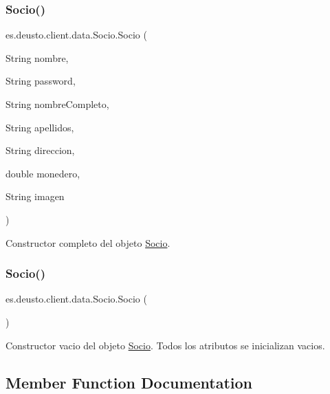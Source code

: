 \subsubsection{\texorpdfstring{Socio()}{Socio()}\hspace{0.1cm}{\footnotesize\ttfamily [1/2]}}
{\footnotesize\ttfamily es.\+deusto.\+client.\+data.\+Socio.\+Socio (\begin{DoxyParamCaption}\item[{String}]{nombre,  }\item[{String}]{password,  }\item[{String}]{nombre\+Completo,  }\item[{String}]{apellidos,  }\item[{String}]{direccion,  }\item[{double}]{monedero,  }\item[{String}]{imagen }\end{DoxyParamCaption})}

Constructor completo del objeto \mbox{\hyperlink{classes_1_1deusto_1_1client_1_1data_1_1_socio}{Socio}}. \mbox{\label{classes_1_1deusto_1_1client_1_1data_1_1_socio_afc3a227c9275ef5622c8b80106ed76a2}} 
\subsubsection{\texorpdfstring{Socio()}{Socio()}\hspace{0.1cm}{\footnotesize\ttfamily [2/2]}}
{\footnotesize\ttfamily es.\+deusto.\+client.\+data.\+Socio.\+Socio (\begin{DoxyParamCaption}{ }\end{DoxyParamCaption})}

Constructor vacio del objeto \mbox{\hyperlink{classes_1_1deusto_1_1client_1_1data_1_1_socio}{Socio}}. Todos los atributos se inicializan vacios. 

\subsection{Member Function Documentation}
\mbox{\label{classes_1_1deusto_1_1client_1_1data_1_1_socio_a50476fc68286b935fb935ddea81a0cc4}} 
